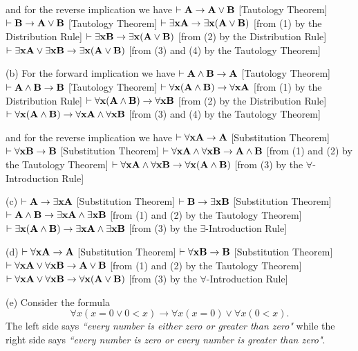 and for the reverse implication we have
 $\vdash {\bf A} \to {\bf A} \lor {\bf B}$ \hfill [Tautology Theorem]
 $\vdash {\bf B} \to {\bf A} \lor {\bf B}$ \hfill [Tautology Theorem]
 $\vdash \exists{\bf x}{\bf A} \to \exists{\bf x}({\bf A} \lor {\bf B})$ \hfill [from (1) by the Distribution Rule]
 $\vdash \exists{\bf x}{\bf B} \to \exists{\bf x}({\bf A} \lor {\bf B})$ \hfill [from (2) by the Distribution Rule]
 $\vdash \exists{\bf x}{\bf A} \lor \exists{\bf x}{\bf B} \to \exists{\bf x}({\bf A} \lor {\bf B})$ \hfill [from (3) and (4) by the Tautology Theorem]
\smallskip 

\ansitem (b) For the forward implication we have
 $\vdash {\bf A} \land {\bf B} \to {\bf A}$ \hfill [Tautology Theorem]
 $\vdash {\bf A} \land {\bf B} \to {\bf B}$ \hfill [Tautology Theorem]
 $\vdash \forall{\bf x}({\bf A} \land {\bf B}) \to \forall{\bf x}{\bf A}$ \hfill [from (1) by the Distribution Rule]
 $\vdash \forall{\bf x}({\bf A} \land {\bf B}) \to \forall{\bf x}{\bf B}$ \hfill [from (2) by the Distribution Rule]
 $\vdash \forall{\bf x}({\bf A} \land {\bf B}) \to \forall{\bf x}{\bf A} \land \forall{\bf x}{\bf B}$ \hfill [from (3) and (4) by the Tautology Theorem]

and for the reverse implication we have
 $\vdash \forall{\bf x}{\bf A} \to {\bf A}$ \hfill [Substitution Theorem]
 $\vdash \forall{\bf x}{\bf B} \to {\bf B}$ \hfill [Substitution Theorem]
 $\vdash \forall{\bf x}{\bf A} \land \forall{\bf x}{\bf B} \to {\bf A} \land {\bf B}$ \hfill [from (1) and (2) by the Tautology Theorem]
 $\vdash \forall{\bf x}{\bf A} \land \forall{\bf x}{\bf B} \to \forall{\bf x}({\bf A} \land {\bf B})$ \hfill [from (3) by the $\forall$-Introduction Rule]
\smallskip 

\ansitem (c)
 $\vdash {\bf A} \to \exists{\bf x}{\bf A}$ \hfill [Substitution Theorem]
 $\vdash {\bf B} \to \exists{\bf x}{\bf B}$ \hfill [Substitution Theorem]
 $\vdash {\bf A} \land {\bf B} \to \exists{\bf x}{\bf A} \land \exists{\bf x}{\bf B}$ \hfill [from (1) and (2) by the Tautology Theorem]
 $\vdash \exists{\bf x}({\bf A} \land {\bf B}) \to \exists{\bf x}{\bf A} \land \exists{\bf x}{\bf B}$ \hfill [from (3) by the $\exists$-Introduction Rule]
\smallskip 

\ansitem (d)
 $\vdash \forall{\bf x}{\bf A} \to {\bf A}$ \hfill [Substitution Theorem]
 $\vdash \forall{\bf x}{\bf B} \to {\bf B}$ \hfill [Substitution Theorem]
 $\vdash \forall{\bf x}{\bf A} \lor \forall{\bf x}{\bf B} \to {\bf A} \lor {\bf B}$ \hfill [from (1) and (2) by the Tautology Theorem]
 $\vdash \forall{\bf x}{\bf A} \lor \forall{\bf x}{\bf B} \to \forall{\bf x}({\bf A} \lor {\bf B})$ \hfill [from (3) by the $\forall$-Introduction Rule]
\smallskip 

\ansitem (e) Consider the formula
$$
\forall x (x=0 \lor 0 < x) \to \forall x (x=0) \lor \forall x (0 < x).
$$
The left side says {\it ``every number is either zero or greater than zero"} while 
the right side says {\it ``every number is zero or every number is greater than zero"}.

